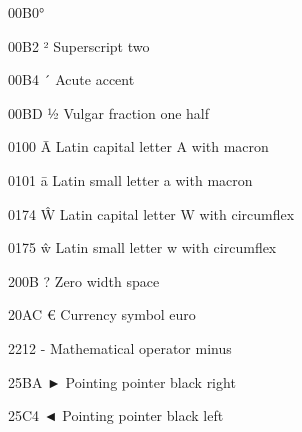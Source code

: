 \documentclass[10pt,a4paper]{book}
\begin{document}
00B0° %

00B2 ² Superscript two

00B4 ´ Acute accent

00BD ½ Vulgar fraction one half

0100 Ā Latin capital letter A with macron

0101 ā Latin small letter a with macron

0174 Ŵ Latin capital letter W with circumflex

0175 ŵ Latin small letter w with circumflex

200B ​? Zero width space

20AC € Currency symbol euro

2212 - Mathematical operator minus

25BA ► Pointing pointer black right

25C4 ◄ Pointing pointer black left
\end{document}
